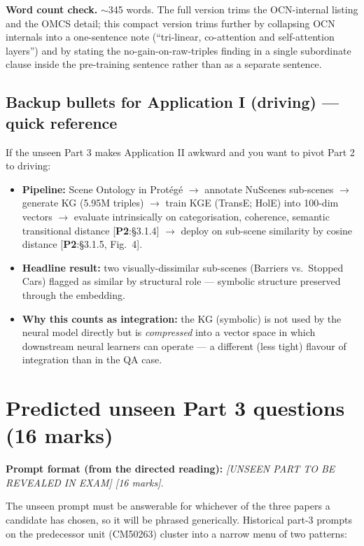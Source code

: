 \documentclass[11pt, a4paper]{article}
\newcommand{\paperref}[1]{\textcolor{srcBd}{\small[\textbf{P2}:#1]}}
\begin{document}
\textbf{Word count check.} $\sim$345 words. The full version trims the OCN-internal listing and the OMCS detail; this compact version trims further by collapsing OCN internals into a one-sentence note (``tri-linear, co-attention and self-attention layers'') and by stating the no-gain-on-raw-triples finding in a single subordinate clause inside the pre-training sentence rather than as a separate sentence.

\subsection{Backup bullets for Application I (driving) — quick reference}

If the unseen Part 3 makes Application II awkward and you want to pivot Part 2 to driving:

\begin{itemize}[itemsep=0.1em]
  \item \textbf{Pipeline:} Scene Ontology in Protégé \(\to\) annotate NuScenes sub-scenes \(\to\) generate KG (5.95M triples) \(\to\) train KGE (TransE; HolE) into 100-dim vectors \(\to\) evaluate intrinsically on categorisation, coherence, semantic transitional distance \paperref{§3.1.4} \(\to\) deploy on sub-scene similarity by cosine distance \paperref{§3.1.5, Fig.\ 4}.
  \item \textbf{Headline result:} two visually-dissimilar sub-scenes (Barriers vs.\ Stopped Cars) flagged as similar by structural role — symbolic structure preserved through the embedding.
  \item \textbf{Why this counts as integration:} the KG (symbolic) is not used by the neural model directly but is \emph{compressed} into a vector space in which downstream neural learners can operate — a different (less tight) flavour of integration than in the QA case.
\end{itemize}

\section{Predicted unseen Part 3 questions (16 marks)}

\textbf{Prompt format (from the directed reading):} \emph{[UNSEEN PART TO BE REVEALED IN EXAM] [16 marks]}.

The unseen prompt must be answerable for whichever of the three papers a candidate has chosen, so it will be phrased generically. Historical part-3 prompts on the predecessor unit (CM50263) cluster into a narrow menu of two patterns:
\end{document}
